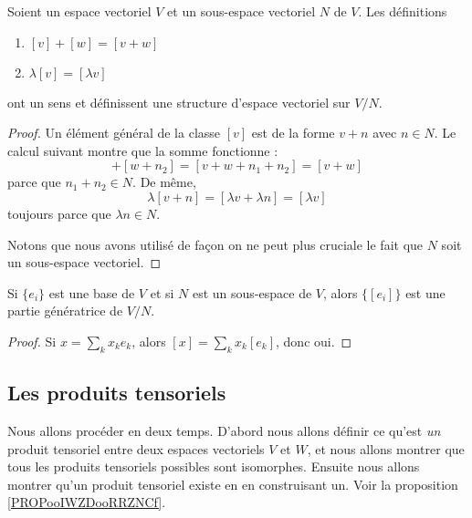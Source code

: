 \begin{proposition}
    Soient un espace vectoriel \( V\) et un sous-espace vectoriel \( N\) de \( V\). Les définitions
    \begin{enumerate}
        \item
            \( [v]+[w]=[v+w]\)
        \item
            \( \lambda[v]=[\lambda v]\)
    \end{enumerate}
    ont un sens et définissent une structure d'espace vectoriel sur \( V/N\).
\end{proposition}

\begin{proof}
    Un élément général de la classe \( [v]\) est de la forme \( v+n\) avec \( n\in N\). Le calcul suivant montre que la somme fonctionne : 
    \begin{equation}
        [v+n_1]+[w+n_2]=[v+w+n_1+n_2]=[v+w]
    \end{equation}
    parce que \( n_1+n_2\in N\). De même,
    \begin{equation}
        \lambda[v+n]=[\lambda v+\lambda n]=[\lambda v]
    \end{equation}
    toujours parce que \( \lambda n\in N\).

    Notons que nous avons utilisé de façon on ne peut plus cruciale le fait que \( N\) soit un sous-espace vectoriel.
\end{proof}

\begin{proposition}
    Si \( \{ e_i \}\) est une base de \( V\) et si \( N\) est un sous-espace de \( V\), alors \( \{ [e_i] \}\) est une partie génératrice de \( V/N\).
\end{proposition}

\begin{proof}
    Si \( x=\sum_kx_ke_k\), alors \( [x]=\sum_kx_k[e_k]\), donc oui.
\end{proof}


\subsection{Les produits tensoriels}

Nous allons procéder en deux temps. D'abord nous allons définir ce qu'est \emph{un} produit tensoriel entre deux espaces vectoriels \( V\) et \( W\), et nous allons montrer que tous les produits tensoriels possibles sont isomorphes. Ensuite nous allons montrer qu'un produit tensoriel existe en en construisant un. Voir la proposition \ref{PROPooIWZDooRRZNCf}.

